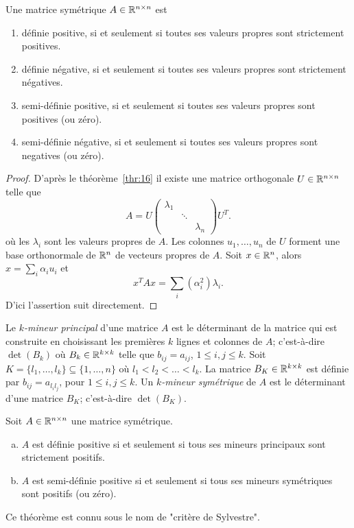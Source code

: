 \begin{theorem}
  \label{thr:15}
  Une matrice symétrique $A \in \mathbb{R}^{n \times n}$ est 
  \begin{enumerate}
  \item définie positive,
    si et seulement si toutes ses valeurs propres sont strictement positives. 
  \item définie négative, si et seulement si toutes ses valeurs propres sont strictement négatives. 
  \item semi-définie positive, si et seulement si toutes ses valeurs propres sont positives (ou zéro).  
  \item semi-définie négative, si et seulement si toutes ses valeurs propres sont negatives (ou zéro).  
  \end{enumerate}
\end{theorem}

\begin{proof}
  D'après le théorème~\ref{thr:16} il existe une 
  matrice orthogonale $U \in \mathbb{R}^{n\times n}$ telle que 
  \begin{equation}
    \label{eq:10}    
    A = U
    \begin{pmatrix}
      \lambda_1 \\
      & \ddots \\
      && \lambda_n
    \end{pmatrix} U^T. 
  \end{equation}
  où les $\lambda_i$ sont les valeurs propres de $A$. Les colonnes  $u_1,\dots,u_n$ de $U$ forment une base orthonormale de $\mathbb{R}^n$  de vecteurs propres de $A$. 
  Soit $x \in \mathbb{R}^n$, alors $x = \sum_i \alpha_i u_i$ et 
  \begin{displaymath}
    x^TAx = \sum_i (\alpha_i^2) \lambda_i.  
  \end{displaymath}
D'ici l'assertion suit directement. 
\end{proof}

Le \emph{$k$-mineur principal} d'une matrice $A$ est le déterminant de la matrice qui est construite en choisissant les premières $k$ lignes et colonnes de $A$; c'est-à-dire $\det(B_k)$ où $B_k \in \mathbb{R}^{k\times k}$ telle que $b_{ij} = a_{ij}$, $1 \leq i,j \leq k$. Soit $K  = \{l_1,\dots,l_k\}\subseteq \{1,\dots,n\}$ où $l_1<l_2<\dots<l_k$. 
La matrice $B_K \in \mathbb{R}^{k\times k}$  est définie par $b_{ij} = a_{l_il_j}$, pour $1 \leq i,j\leq k$. Un \emph{$k$-mineur symétrique} de $A$ est le déterminant d'une matrice $B_K$; c'est-à-dire $\det(B_K)$.  

\begin{theorem}
  \label{thr:17}
  Soit $A \in  \mathbb{R}^{n \times n}$ une matrice symétrique.   
  \begin{enumerate}[a)]
  \item $A$ \label{posdef:1}
    est définie positive si et seulement si tous ses mineurs
    principaux sont strictement positifs.
  \item $A$ \label{posdef:2}
    est semi-définie positive si et seulement si tous ses mineurs symétriques sont positifs (ou zéro).
  \end{enumerate}
  Ce théorème est connu sous le nom de "critère de Sylvestre".
\end{theorem}

